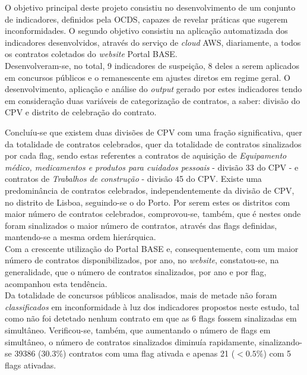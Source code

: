 O objetivo principal deste projeto consistiu no desenvolvimento de um conjunto de indicadores, definidos pela OCDS, capazes de revelar práticas que sugerem inconformidades. O segundo objetivo consistiu na aplicação automatizada dos indicadores desenvolvidos, através do serviço de \textit{cloud} AWS, diariamente, a todos os contratos coletados do \textit{website} Portal BASE.\\

Desenvolveram-se, no total, 9 indicadores de suspeição, 8 deles a serem aplicados em concursos públicos e o remanescente em ajustes diretos em regime geral. O desenvolvimento, aplicação e análise do \textit{output} gerado por estes indicadores tendo em consideração duas variáveis de categorização de contratos, a saber: divisão do CPV e distrito de celebração do contrato. 

Concluíu-se que existem duas divisões de CPV com uma fração significativa, quer da totalidade de contratos celebrados, quer da totalidade de contratos sinalizados por cada flag, sendo estas referentes a contratos de aquisição de \textit{Equipamento médico, medicamentos e produtos para cuidados pessoais} - divisão 33 do CPV - e contratos de \textit{Trabalhos de construção} - divisão 45 do CPV. Existe uma predominância de contratos celebrados, independentemente da divisão de CPV, no distrito de Lisboa, seguindo-se o do Porto. Por serem estes os distritos com maior número de contratos celebrados, comprovou-se, também, que é nestes onde foram sinalizados o maior número de contratos, através das flags definidas, mantendo-se a mesma ordem hierárquica. \\

Com a crescente utilização do Portal BASE e, consequentemente, com um maior número de contratos disponibilizados, por ano, no \textit{website}, constatou-se, na generalidade, que o número de contratos sinalizados, por ano e por flag, acompanhou esta tendência.\\

Da totalidade de concursos públicos analisados, mais de metade não foram \textit{classificados} em inconformidade à luz dos indicadores propostos neste estudo, tal como não foi detetado nenhum contrato em que as 6 flags fossem sinalizadas em simultâneo. Verificou-se, também, que aumentando o número de flags em simultâneo, o número de contratos sinalizados diminuía rapidamente, sinalizando-se 39386 (30.3\%) contratos com uma flag ativada e apenas 21 ($ < 0.5\%$) com 5 flags ativadas.\\


